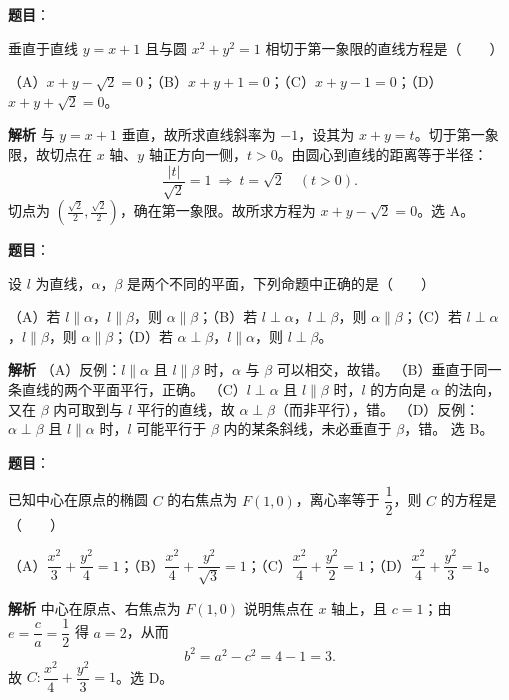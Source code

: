 \begin{answer}

\textbf{题目}：

垂直于直线 $y=x+1$ 且与圆 $x^2+y^2=1$ 相切于第一象限的直线方程是\mbox{（　　）}

（A）$x+y-\sqrt2=0$；（B）$x+y+1=0$；（C）$x+y-1=0$；（D）$x+y+\sqrt2=0$。

\textbf{解析}
与 $y=x+1$ 垂直，故所求直线斜率为 $-1$，设其为 $x+y=t$。切于第一象限，故切点在 $x$ 轴、$y$ 轴正方向一侧，$t>0$。由圆心到直线的距离等于半径：
\nopagebreak[4]
\[\frac{|t|}{\sqrt2}=1\ \Longrightarrow\ t=\sqrt2\quad(t>0).\]
切点为 $\left(\frac{\sqrt2}2,\frac{\sqrt2}2\right)$，确在第一象限。故所求方程为 $x+y-\sqrt2=0$。选 A。


\end{answer}
\begin{answer}

\textbf{题目}：

设 $l$ 为直线，$\alpha$，$\beta$ 是两个不同的平面，下列命题中正确的是\mbox{（　　）}

（A）若 $l\parallel\alpha$，$l\parallel\beta$，则 $\alpha\parallel\beta$；（B）若 $l\perp\alpha$，$l\perp\beta$，则 $\alpha\parallel\beta$；（C）若 $l\perp\alpha$，$l\parallel\beta$，则 $\alpha\parallel\beta$；（D）若 $\alpha\perp\beta$，$l\parallel\alpha$，则 $l\perp\beta$。

\textbf{解析}
（A）反例：$l\parallel\alpha$ 且 $l\parallel\beta$ 时，$\alpha$ 与 $\beta$ 可以相交，故错。
（B）垂直于同一条直线的两个平面平行，正确。
（C）$l\perp\alpha$ 且 $l\parallel\beta$ 时，$l$ 的方向是 $\alpha$ 的法向，又在 $\beta$ 内可取到与 $l$ 平行的直线，故 $\alpha\perp\beta$（而非平行），错。
（D）反例：$\alpha\perp\beta$ 且 $l\parallel\alpha$ 时，$l$ 可能平行于 $\beta$ 内的某条斜线，未必垂直于 $\beta$，错。
选 B。


\end{answer}
\begin{answer}

\textbf{题目}：

已知中心在原点的椭圆 $C$ 的右焦点为 $F(1,0)$，离心率等于 $\dfrac12$，则 $C$ 的方程是\mbox{（　　）}

（A）$\dfrac{x^2}3+\dfrac{y^2}4=1$；（B）$\dfrac{x^2}4+\dfrac{y^2}{\sqrt3}=1$；（C）$\dfrac{x^2}4+\dfrac{y^2}2=1$；（D）$\dfrac{x^2}4+\dfrac{y^2}3=1$。

\textbf{解析}
中心在原点、右焦点为 $F(1,0)$ 说明焦点在 $x$ 轴上，且 $c=1$；由 $e=\dfrac ca=\dfrac12$ 得 $a=2$，从而
\nopagebreak[4]
\[b^2=a^2-c^2=4-1=3.\]
故 $C:\dfrac{x^2}4+\dfrac{y^2}3=1$。选 D。


\end{answer}
